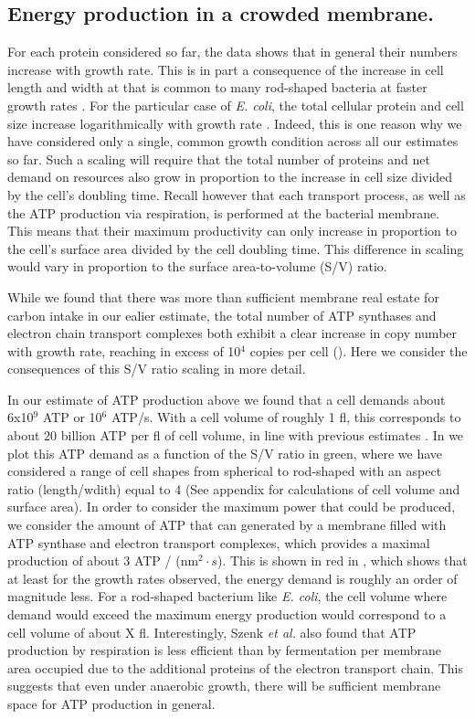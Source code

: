 \subsection{Energy production in a crowded membrane.}

For each protein considered so far, the data shows that in general their numbers
increase with growth rate. This is in part a consequence of the increase in cell
length and width at that is common to many rod-shaped bacteria at faster growth
rates \citep{ojkic2019, harris2018}. For the particular case of \textit{E.
coli}, the total cellular protein and cell size increase logarithmically with
growth rate \citep{schaechter1958, si2017}. Indeed, this is one reason why we
have considered only a single, common growth condition across all our estimates
so far. Such a scaling will require that the total number of proteins and net
demand on resources also grow in proportion to the increase in cell size divided
by the cell's doubling time. Recall however that each transport process, as well
as the ATP production via respiration, is performed at the bacterial membrane.
This means that their maximum productivity can only increase in proportion to
the cell's surface area divided by the cell doubling time. This difference in
scaling would vary in proportion to the surface area-to-volume (S/V) ratio.

While we found that there was more than sufficient membrane real estate for
carbon intake in our ealier estimate, the total number of ATP synthases and
electron chain transport complexes both exhibit a clear increase in copy number
with growth rate, reaching in excess of 10$^4$ copies per cell
(). Here we consider the consequences of this
S/V ratio scaling in more detail.

In our estimate of ATP production above we found that a cell demands about
6x10$^9$ ATP or 10$^6$ ATP/s. With a cell volume of roughly 1 fl, this
corresponds to about 20 billion ATP per fl of cell volume, in line  with
previous estimates \citep{stouthamer1977, szenk2017}. In 
we plot this ATP demand as a function of the S/V ratio in green, where we have
considered a range of cell shapes from spherical to rod-shaped with an aspect
ratio (length/wdith) equal to 4 (See appendix for calculations of cell volume
and surface area).  In order to consider the maximum power that could be
produced, we consider the amount of ATP that can generated by a membrane filled
with ATP synthase and electron transport complexes, which provides a maximal
production of about 3 ATP / (nm$^2 \cdot s$). This is shown in red in
, which shows that at least for the growth rates
observed, the energy demand is roughly an order of magnitude less.  For a
rod-shaped bacterium like \textit{E. coli}, the cell volume where demand would
exceed the maximum energy production would correspond to a cell volume of about
X fl. Interestingly, Szenk \textit{et al.} also found that ATP production by
respiration is less efficient than by fermentation per membrane area occupied
due to the additional proteins of the electron transport chain. This suggests
that even under anaerobic growth, there will be sufficient membrane space for
ATP production in general.


